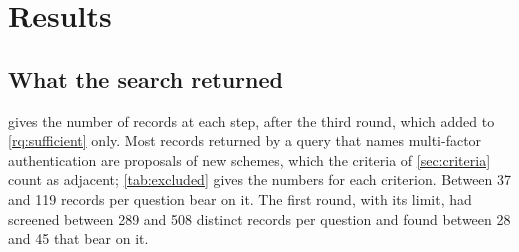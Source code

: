 \section{Results}\label{sec:results}

\subsection{What the search returned}\label{sec:flow}

 gives the number of records at each step, after the
third round, which added to \cref{rq:sufficient} only.
Most records returned by a query that names multi-factor authentication
are proposals of new schemes, which the criteria of \cref{sec:criteria}
count as adjacent; \cref{tab:excluded} gives the numbers for each
criterion.
Between 37 and 119 records per question bear on it.
The first round, with its limit, had screened between 289 and 508
distinct records per question and found between 28 and 45 that bear on
it.
